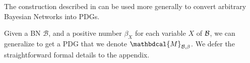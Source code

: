 \documentclass{article}
\theoremstyle{plain}
\theoremstyle{definition}
\theoremstyle{remark}
\newcommand{\dg}[1]{\mathbdcal{#1}}
\newcommand{\PDGof}[1]{{\dg M}_{#1}}
\numberwithin{equation}{section}
\begin{document}
The construction described in  can be used more
generally to convert arbitrary Bayesian Networks into PDGs.
\begin{defn}[BN to PDG]
	Given a BN $\mathcal B$, and a positive number $\beta_X$ for
        each variable $X$ of $\cal B$,
we can generalize  to get a
PDG that we denote $\PDGof{\mathcal B, \beta}$.  We defer the
straightforward formal details
to the appendix. %
\end{defn}
\end{document}
